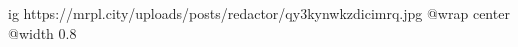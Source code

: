 
 
 
 
 

\ifcmt
  ig https://mrpl.city/uploads/posts/redactor/qy3kynwkzdicimrq.jpg
  @wrap center
  @width 0.8
\fi
